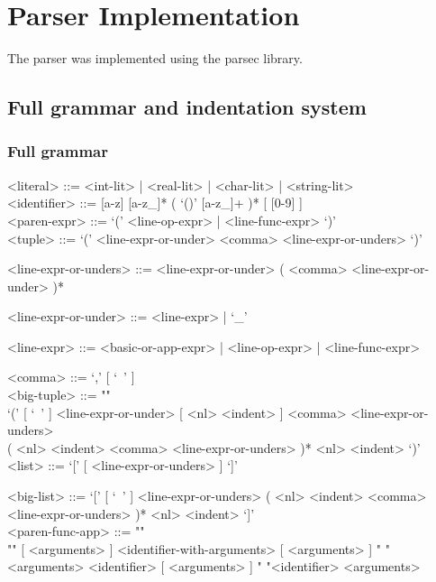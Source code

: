 \documentclass{article}
\begin{document}
\section{Parser Implementation}

The parser was implemented using the parsec library.

\subsection{Full grammar and indentation system}

\subsubsection{Full grammar}

\begin{grammar}

<literal> ::= <int-lit> | <real-lit> | <char-lit> | <string-lit>
\\

<identifier> ::= [a-z] [a-z_]* ( `()' [a-z_]+ )* [ [0-9] ]
\\

<paren-expr> ::= `(' <line-op-expr> | <line-func-expr> `)'  
\\

<tuple> ::= `(' <line-expr-or-under> <comma> <line-expr-or-unders> `)'

<line-expr-or-unders> ::= <line-expr-or-under> ( <comma> <line-expr-or-under> )*

<line-expr-or-under> ::= <line-expr> | `_'

<line-expr> ::= <basic-or-app-expr> | <line-op-expr> | <line-func-expr>

<comma> ::= `,' [ `\ ' ]
\\

<big-tuple> ::= ""\\
`(' [ `\ ' ] <line-expr-or-under> [ <nl> <indent> ]
<comma> <line-expr-or-unders> \\
( <nl> <indent> <comma> <line-expr-or-unders> )* 
<nl> <indent> `)'
\\

<list> ::= `[' [ <line-expr-or-unders> ] `]'

<big-list> ::= 
`[' [ `\ ' ] <line-expr-or-unders>
( <nl> <indent> <comma> <line-expr-or-unders> )* <nl> <indent> `]'
\\

<paren-func-app> ::= ""\\""
[ <arguments> ] <identifier-with-arguments> [ <arguments> ]
\alt " "<arguments> <identifier> [ <arguments> ]
\alt " "<identifier> <arguments>


\end{grammar}
\end{document}
